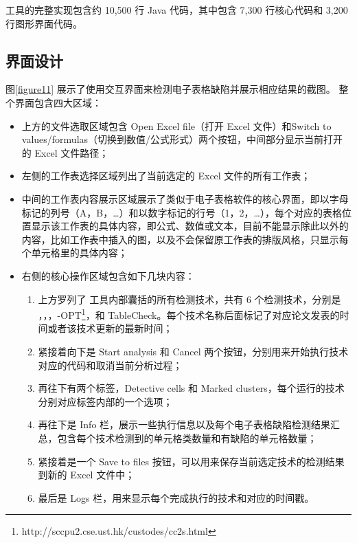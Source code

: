 \sg 工具的完整实现包含约 10,500 行 Java 代码，其中包含 7,300 行核心代码和 3,200 行图形界面代码。

\subsection{界面设计}






图\ref{figure11} 展示了\sg 使用交互界面来检测电子表格缺陷并展示相应结果的截图。
整个界面包含四大区域：

\begin{itemize}
    \item 上方的文件选取区域包含 Open Excel file（打开 Excel 文件）和Switch to values/formulas（切换到数值/公式形式）两个按钮，中间部分显示当前打开的 Excel 文件路径；
    
    \item 左侧的工作表选择区域列出了当前选定的 Excel 文件的所有工作表；
    
    \item 中间的工作表内容展示区域展示了类似于电子表格软件的核心界面，即以字母标记的列号（A，B，\dots）和以数字标记的行号（1，2，\dots），每个对应的表格位置显示该工作表的具体内容，即公式、数值或文本，目前不能显示除此以外的内容，比如工作表中插入的图，以及不会保留原工作表的排版风格，只显示每个单元格里的具体内容；
    
    \item 右侧的核心操作区域包含如下几块内容：

        \begin{enumerate}
            \item 上方罗列了 \sg 工具内部囊括的所有检测技术，共有 6 个检测技术，分别是 \am\cite{dou2014spreadsheet}，\ca\cite{dou2017cacheck}，\cu\cite{cheung2016custodes}，\cu-OPT\footnote{http://sccpu2.cse.ust.hk/custodes/cc2s.html}，\wa 和 TableCheck\cite{dou2016detecting}。每个技术名称后面标记了对应论文发表的时间或者该技术更新的最新时间；
            
            \item 紧接着向下是 Start analysis 和 Cancel 两个按钮，分别用来开始执行技术对应的代码和取消当前分析过程；
            
            \item 再往下有两个标签，Detective cells 和 Marked clusters，每个运行的技术分别对应标签内部的一个选项；
            
            \item 再往下是 Info 栏，展示一些执行信息以及每个电子表格缺陷检测结果汇总，包含每个技术检测到的单元格类数量和有缺陷的单元格数量；
            
            \item 紧接着是一个 Save to files 按钮，可以用来保存当前选定技术的检测结果到新的 Excel 文件中；
            
            \item 最后是 Logs 栏，用来显示每个完成执行的技术和对应的时间戳。
        \end{enumerate}

\end{itemize}

